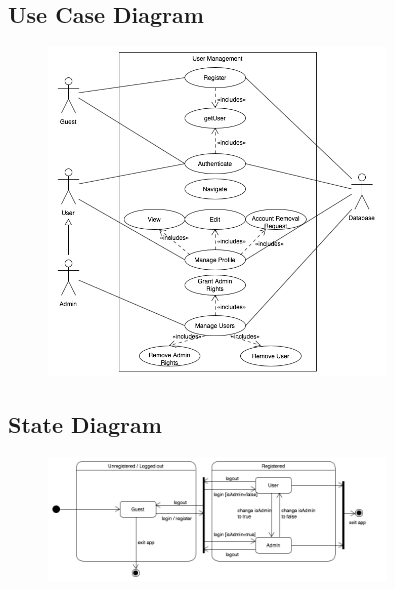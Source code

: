 \subsection{Use Case Diagram}
\begin{figure}[!htbp]
	\includegraphics[width=0.8\textwidth]{User_Management/User_Management_Use_Case.png}
\end{figure}

\subsection{State Diagram}
\begin{figure}[!htbp]
	\includegraphics[width=0.8\textwidth]{User_Management/User_Management_State_Diagram.png}
\end{figure}


